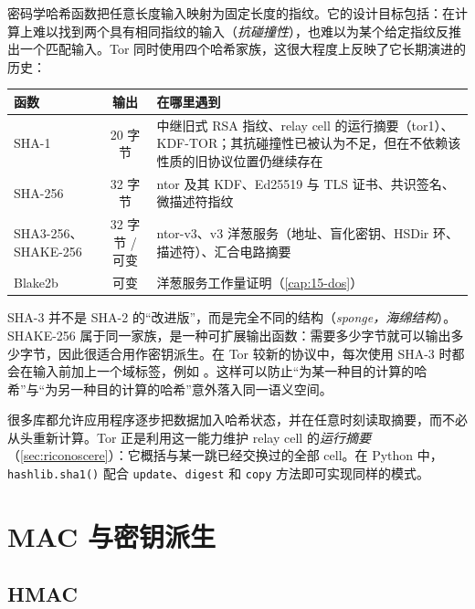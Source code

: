 密码学哈希函数把任意长度输入映射为固定长度的指纹。它的设计目标包括：在计算上难以找到两个具有相同指纹的输入（\emph{抗碰撞性}），也难以为某个给定指纹反推出一个匹配输入。Tor 同时使用四个哈希家族，这很大程度上反映了它长期演进的历史：
\begin{center}\small
\begin{tabularx}{\textwidth}{@{}l c >{\raggedright\arraybackslash}X@{}}
\toprule
函数 & 输出 & 在哪里遇到 \\
\midrule
SHA-1 & 20 字节 & 中继旧式 RSA 指纹、relay cell 的运行摘要（tor1）、KDF-TOR；其抗碰撞性已被认为不足，但在不依赖该性质的旧协议位置仍继续存在 \\
SHA-256 & 32 字节 & ntor 及其 KDF、Ed25519 与 TLS 证书、共识签名、微描述符指纹 \\
SHA3-256、SHAKE-256 & 32 字节 / 可变 & ntor-v3、v3 洋葱服务（地址、盲化密钥、HSDir 环、描述符）、汇合电路摘要 \\
Blake2b & 可变 & 洋葱服务工作量证明（\cref{cap:15-dos}） \\
\bottomrule
\end{tabularx}
\end{center}

SHA-3 并不是 SHA-2 的“改进版”，而是完全不同的结构（\emph{sponge，海绵结构}）。SHAKE-256 属于同一家族，是一种可扩展输出函数：需要多少字节就可以输出多少字节，因此很适合用作密钥派生。在 Tor 较新的协议中，每次使用 SHA-3 时都会在输入前加上一个域标签，例如 。这样可以防止“为某一种目的计算的哈希”与“为另一种目的计算的哈希”意外落入同一语义空间。

\begin{approfondimento}[运行哈希]
很多库都允许应用程序逐步把数据加入哈希状态，并在任意时刻读取摘要，而不必从头重新计算。Tor 正是利用这一能力维护 relay cell 的\emph{运行摘要}（\cref{sec:riconoscere}）：它概括与某一跳已经交换过的全部 cell。在 Python 中，\texttt{hashlib.sha1()} 配合 \texttt{update}、\texttt{digest} 和 \texttt{copy} 方法即可实现同样的模式。
\end{approfondimento}

\section{MAC 与密钥派生}\label{sec:cripto-mac}

\subsection{HMAC}

